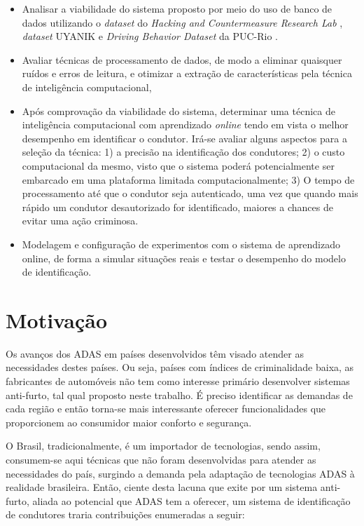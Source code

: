 \begin{itemize}
	
	\item Analisar a viabilidade do sistema proposto por meio do uso de banco de dados utilizando o \textit{dataset} do \textit{Hacking and Countermeasure Research Lab} \cite{kwak2016know}, \textit{dataset} UYANIK \cite{Abut2007} e \textit{Driving Behavior Dataset} da PUC-Rio \cite{OLIVEIRAVASCONCELOS2017}.
	
	\item Avaliar técnicas de processamento de dados, de modo a eliminar quaisquer ruídos e erros de leitura, e otimizar a extração de características pela técnica de inteligência computacional, 
	
	\item Após comprovação da viabilidade do sistema, determinar uma técnica de inteligência computacional com aprendizado \textit{online} tendo em vista o melhor desempenho em identificar o condutor. Irá-se avaliar alguns aspectos para a seleção da técnica: 1) a precisão na identificação dos condutores; 2) o custo computacional da mesmo, visto que o sistema poderá potencialmente ser embarcado em uma plataforma limitada computacionalmente; 3) O tempo de processamento até que o condutor seja autenticado, uma vez que quando mais rápido um condutor desautorizado for identificado, maiores a chances de evitar uma ação criminosa.
	
	\item Modelagem e configuração de experimentos com o sistema de aprendizado online, de forma a simular situações reais e testar o desempenho do modelo de identificação.

	
\end{itemize} 

\section{Motivação}

Os avanços dos ADAS em países desenvolvidos têm visado atender as necessidades destes países. Ou seja, países com índices de criminalidade baixa, as fabricantes de automóveis não tem como interesse primário desenvolver sistemas anti-furto, tal qual proposto neste trabalho. É preciso identificar as demandas de cada região e então torna-se mais interessante oferecer funcionalidades que proporcionem ao consumidor maior conforto e segurança.

O Brasil, tradicionalmente, é um importador de tecnologias, sendo assim, consumem-se aqui técnicas que não foram desenvolvidas para atender as necessidades do país, surgindo a demanda pela adaptação de tecnologias ADAS à realidade brasileira. Então, ciente desta lacuna que exite por um sistema anti-furto, aliada ao potencial que ADAS tem a oferecer, um sistema de identificação de condutores traria contribuições enumeradas a seguir:

